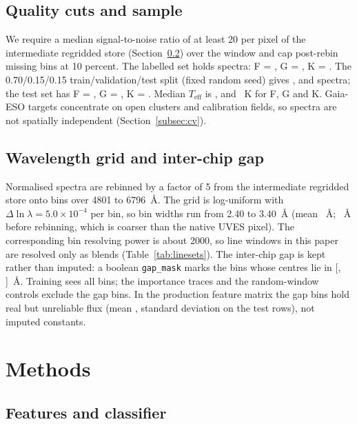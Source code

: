 \documentclass[11pt,a4paper]{article}
\newcommand{\Teff}{$T_{\mathrm{eff}}$\xspace}
\begin{document}
\subsection{Quality cuts and sample}

We require a median signal-to-noise ratio of at least 20 per pixel of the intermediate regridded store (Section~\ref{subsec:wavelength-grid}) over the window and cap post-rebin missing bins at 10 percent. The labelled set holds \lumNAll{} spectra: F = \lumNF, G = \lumNG, K = \lumNK. The 0.70/0.15/0.15 train/validation/test split (fixed random seed) gives \nTrain, \nVal{} and \nTest{} spectra; the test set has F = \nClassF, G = \nClassG, K = \nClassK. Median \Teff is \lumTeffF, \lumTeffG{} and \lumTeffK~K for F, G and K. Gaia-ESO targets concentrate on open clusters and calibration fields, so spectra are not spatially independent (Section~\ref{subsec:cv}).

\subsection{Wavelength grid and inter-chip gap}
\label{subsec:wavelength-grid}

Normalised spectra are rebinned by a factor of 5 from the intermediate regridded store onto \sdNBins{} bins over 4801 to 6796~\AA. The grid is log-uniform with $\Delta\ln\lambda = 5.0\times10^{-4}$ per bin, so bin widths run from 2.40 to 3.40~\AA{} (mean \meanBinWidth~\AA; \meanBinWidthFine~\AA{} before rebinning, which is coarser than the native UVES pixel). The corresponding bin resolving power is about 2000, so line windows in this paper are resolved only as blends (Table~\ref{tab:linesets}). The inter-chip gap is kept rather than imputed: a boolean \texttt{gap\_mask} marks the \nGapBins{} bins whose centres lie in [\gapLo, \gapHi]~\AA. Training sees all bins; the importance traces and the random-window controls exclude the gap bins. In the production feature matrix the gap bins hold real but unreliable flux (mean \sdGapMean, standard deviation \sdGapSd{} on the test rows), not imputed constants.

\section{Methods}
\label{sec:methods}

\subsection{Features and classifier}
\end{document}
